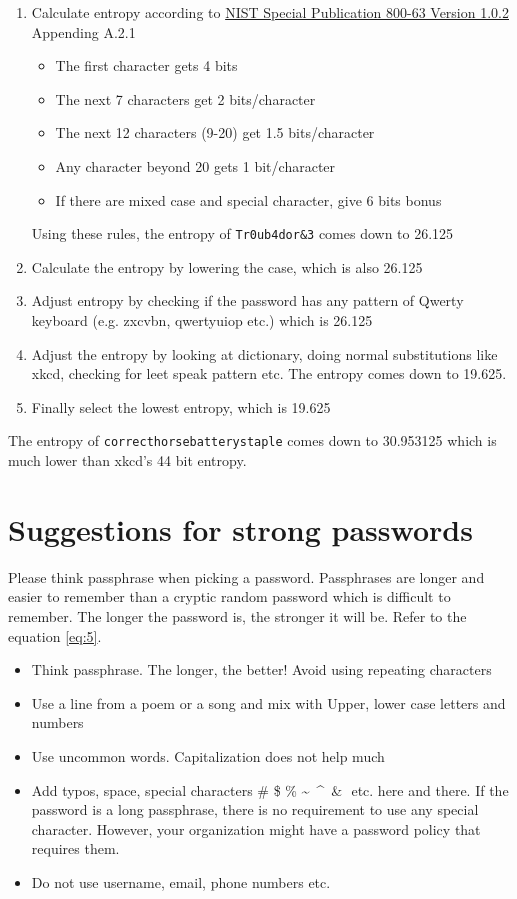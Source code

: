 \begin{enumerate}
    \item Calculate entropy according to
\href{https://nvlpubs.nist.gov/nistpubs/Legacy/SP/nistspecialpublication800-63ver1.0.2.pdf}{NIST Special Publication 800-63 Version 1.0.2} Appending A.2.1
    \begin{itemize}
        \item The first character gets 4 bits
        \item The next 7 characters get 2 bits/character
        \item The next 12 characters (9-20) get 1.5 bits/character
        \item Any character beyond 20 gets 1 bit/character
        \item If there are mixed case and special character, give 6 bits bonus
    \end{itemize}
    Using these rules, the entropy of \texttt{Tr0ub4dor\&3} comes down to 26.125
    \item Calculate the entropy by lowering the case, which is also 26.125
    \item Adjust entropy by checking if the password has any pattern of 
Qwerty keyboard (e.g. zxcvbn, qwertyuiop etc.) which is 26.125
    \item Adjust the entropy by looking at dictionary, doing normal
substitutions like xkcd, checking for leet speak pattern etc. The entropy comes down
to 19.625.
    \item Finally select the lowest entropy, which is 19.625 
\end{enumerate}
The entropy of \texttt{correcthorsebatterystaple} comes down to 30.953125 which
is much lower than xkcd's 44 bit entropy.
\section{Suggestions for strong passwords}
Please think passphrase when picking a password. Passphrases are longer and 
easier to remember than a cryptic random password which is difficult to remember.
The longer the password is, the stronger it will be. Refer to the equation \eqref{eq:5}.
\begin{itemize}
    \item Think passphrase. The longer, the better! Avoid using repeating characters
    \item Use a line from a poem or a song and mix with Upper, lower case letters and numbers
    \item Use uncommon words. Capitalization does not help much
    \item Add typos, space, special characters \! \@ \# \$ \% \textasciitilde \ \textasciicircum \ \& \* \( \) etc. here and there.
If the password is a long passphrase, there is no requirement to use any 
special character. However, your organization might have a password policy 
that requires them.
    \item Do not use username, email, phone numbers etc.
\end{itemize}
